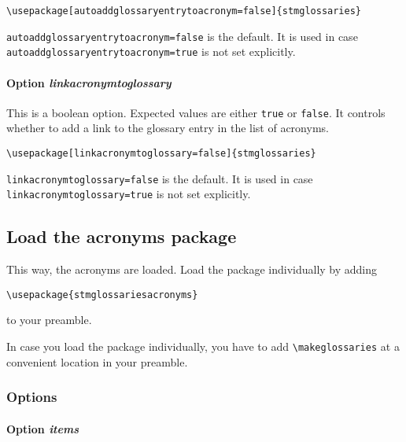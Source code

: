 \documentclass[%
  type=article,%
  layout=koma,%
  hyperref=true,%
  conditionallox=true,%
  conditionalloxnewpage=false,%
  date=true,%
  index=true,%
  listings=true%
]{stmtext}
\begin{document}
\begin{verbatim}
\usepackage[autoaddglossaryentrytoacronym=false]{stmglossaries}
\end{verbatim}

\texttt{autoaddglossaryentrytoacronym=false} is the default. It is used in case \texttt{autoaddglossaryentrytoacronym=true} is not set explicitly.

\paragraph{Option \protect\textit{linkacronymtoglossary}}
\label{sec:usage:preamble:wholepackage:options:linkacronymtoglossary}

This is a boolean option. Expected values are either \texttt{true} or \texttt{false}. It controls whether to add a link to the glossary entry in the list of acronyms. 

\begin{verbatim}
\usepackage[linkacronymtoglossary=false]{stmglossaries}
\end{verbatim}

\texttt{linkacronymtoglossary=false} is the default. It is used in case \texttt{linkacronymtoglossary=true} is not set explicitly.

\subsection{Load the acronyms package}
\label{sec:usage:preamble:acronymspackage}

This way, the acronyms are loaded. Load the package individually by adding

\begin{verbatim}
\usepackage{stmglossariesacronyms}
\end{verbatim}

to your preamble.

In case you load the package individually, you have to add \texttt{\textbackslash makeglossaries} at a convenient location in your preamble.

\subsubsection{Options}

\paragraph{Option \protect\textit{items}}
\end{document}
